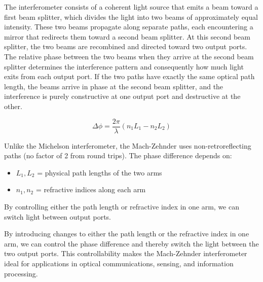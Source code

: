\documentclass[
  a4paper,
]{book}
\providecommand{\tightlist}{%
  \setlength{\itemsep}{0pt}\setlength{\parskip}{0pt}}
\begin{document}
The interferometer consists of a coherent light source that emits a beam
toward a first beam splitter, which divides the light into two beams of
approximately equal intensity. These two beams propagate along separate
paths, each encountering a mirror that redirects them toward a second
beam splitter. At this second beam splitter, the two beams are
recombined and directed toward two output ports. The relative phase
between the two beams when they arrive at the second beam splitter
determines the interference pattern and consequently how much light
exits from each output port. If the two paths have exactly the same
optical path length, the beams arrive in phase at the second beam
splitter, and the interference is purely constructive at one output port
and destructive at the other.

\begin{tcolorbox}[enhanced jigsaw, breakable, toptitle=1mm, bottomrule=.15mm, colbacktitle=quarto-callout-tip-color!10!white, title=\textcolor{quarto-callout-tip-color}{\faLightbulb}\hspace{0.5em}{Mach-Zehnder Phase Difference}, arc=.35mm, rightrule=.15mm, bottomtitle=1mm, opacityback=0, toprule=.15mm, coltitle=black, leftrule=.75mm, opacitybacktitle=0.6, colback=white, left=2mm, titlerule=0mm, colframe=quarto-callout-tip-color-frame]

\[\Delta \phi = \frac{2\pi}{\lambda}(n_1 L_1 - n_2 L_2)\]

Unlike the Michelson interferometer, the Mach-Zehnder uses
non-retroreflecting paths (no factor of 2 from round trips). The phase
difference depends on:

\begin{itemize}
\tightlist
\item
  \(L_1, L_2\) = physical path lengths of the two arms
\item
  \(n_1, n_2\) = refractive indices along each arm
\end{itemize}

By controlling either the path length or refractive index in one arm, we
can switch light between output ports.

\end{tcolorbox}

By introducing changes to either the path length or the refractive index
in one arm, we can control the phase difference and thereby switch the
light between the two output ports. This controllability makes the
Mach-Zehnder interferometer ideal for applications in optical
communications, sensing, and information processing.
\end{document}
